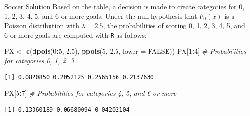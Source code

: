 \documentclass[
  ignorenonframetext,
]{beamer}
\newenvironment{Shaded}{\begin{snugshade}}{\end{snugshade}}
\newcommand{\AttributeTok}[1]{\textcolor[rgb]{0.13,0.29,0.53}{#1}}
\newcommand{\CommentTok}[1]{\textcolor[rgb]{0.56,0.35,0.01}{\textit{#1}}}
\newcommand{\ConstantTok}[1]{\textcolor[rgb]{0.56,0.35,0.01}{#1}}
\newcommand{\DecValTok}[1]{\textcolor[rgb]{0.00,0.00,0.81}{#1}}
\newcommand{\FloatTok}[1]{\textcolor[rgb]{0.00,0.00,0.81}{#1}}
\newcommand{\FunctionTok}[1]{\textcolor[rgb]{0.13,0.29,0.53}{\textbf{#1}}}
\newcommand{\NormalTok}[1]{#1}
\newcommand{\OtherTok}[1]{\textcolor[rgb]{0.56,0.35,0.01}{#1}}
\newcommand{\SpecialCharTok}[1]{\textcolor[rgb]{0.81,0.36,0.00}{\textbf{#1}}}
\begin{document}
\begin{frame}[fragile]{Soccer Solution}
\label{soccer-solution-1}
Based on the table, a decision is made to create categories for 0, 1, 2,
3, 4, 5, and 6 or more goals. Under the null hypothesis that \(F_0(x)\)
is a Poisson distribution with \(\lambda=2.5\), the probabilities of
scoring 0, 1, 2, 3, 4, 5, and 6 or more goals are computed with
\texttt{R} as follows:

\begin{Shaded}
\begin{Highlighting}[]
\NormalTok{PX }\OtherTok{\textless{}{-}} \FunctionTok{c}\NormalTok{(}\FunctionTok{dpois}\NormalTok{(}\DecValTok{0}\SpecialCharTok{:}\DecValTok{5}\NormalTok{, }\FloatTok{2.5}\NormalTok{), }\FunctionTok{ppois}\NormalTok{(}\DecValTok{5}\NormalTok{, }\FloatTok{2.5}\NormalTok{, }\AttributeTok{lower =} \ConstantTok{FALSE}\NormalTok{))}
\NormalTok{PX[}\DecValTok{1}\SpecialCharTok{:}\DecValTok{4}\NormalTok{] }\CommentTok{\# Probabilities for categories 0, 1, 2, 3}
\end{Highlighting}
\end{Shaded}

\begin{verbatim}
[1] 0.0820850 0.2052125 0.2565156 0.2137630
\end{verbatim}

\begin{Shaded}
\begin{Highlighting}[]
\NormalTok{PX[}\DecValTok{5}\SpecialCharTok{:}\DecValTok{7}\NormalTok{] }\CommentTok{\# Probabilities for categories 4, 5, and 6 or more}
\end{Highlighting}
\end{Shaded}

\begin{verbatim}
[1] 0.13360189 0.06680094 0.04202104
\end{verbatim}
\end{frame}
\end{document}
